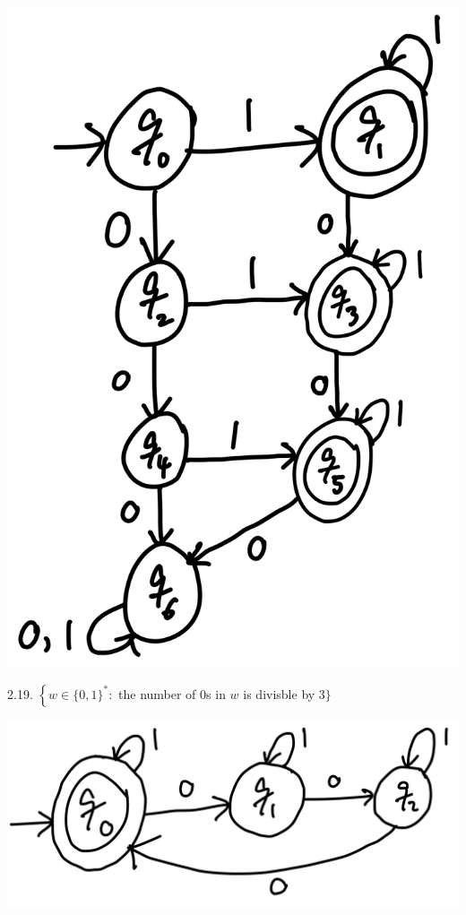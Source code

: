 \documentclass[10pt]{article}
\begin{document}
\begin{enumerate}[label={}]
            \includegraphics[scale=0.2]{2.18}


            2.19. $\left\{w \in\{0,1\}^*:\right.$ the number of 0s in $w$ is divisble by 3$\}$


            \includegraphics[scale=0.2]{2.19}



\end{enumerate}
\end{document}
